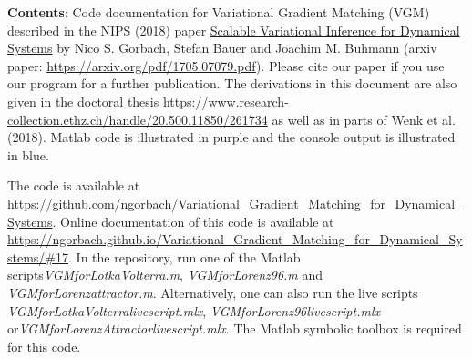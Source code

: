 \vspace{2cm}
{{\Large\textbf{Contents}:}\vspace{0.4cm}
\newline Code documentation for Variational Gradient Matching (VGM) described in the NIPS (2018) paper \href{https://papers.nips.cc/paper/7066-scalable-variational-inference-for-dynamical-systems.pdf}{Scalable Variational Inference for Dynamical Systems} by Nico S. Gorbach, Stefan Bauer and Joachim M. Buhmann (arxiv paper: \href{https://arxiv.org/pdf/1705.07079.pdf}{https://arxiv.org/pdf/1705.07079.pdf}). Please cite our paper if you use our program for a further publication. The derivations in this document are also given in the doctoral thesis \href{https://www.research-collection.ethz.ch/handle/20.500.11850/261734}{https://www.research-collection.ethz.ch/handle/20.500.11850/261734} as well as in parts of Wenk et al. (2018). Matlab code is illustrated in \color{RoyalPurple} purple \color{black} and the console output is illustrated in \color{MidnightBlue} blue\color{black}.

\vspace{0.3cm}
The code is available at \url{https://github.com/ngorbach/Variational_Gradient_Matching_for_Dynamical_Systems}. Online documentation of this code is available at \url{https://ngorbach.github.io/Variational_Gradient_Matching_for_Dynamical_Systems/#17}. In the repository, run one of the Matlab scripts\newline \textit{VGM\textunderscore for\textunderscore Lotka\textunderscore Volterra.m}, \textit{VGM\textunderscore for\textunderscore Lorenz96.m} and \textit{VGM\textunderscore for\textunderscore Lorenz\textunderscore attractor.m}. Alternatively, one can also run the live scripts \textit{VGM\textunderscore for\textunderscore Lotka\textunderscore Volterra\textunderscore live\textunderscore script.mlx}, \textit{VGM\textunderscore for\textunderscore Lorenz96\textunderscore live\textunderscore script.mlx} or\newline \textit{VGM\textunderscore for\textunderscore Lorenz\textunderscore Attractor\textunderscore live\textunderscore script.mlx}. The Matlab symbolic toolbox is required for this code.}


